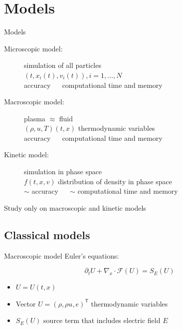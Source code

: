 \documentclass{beamer}
\newcommand{\cmark}{{\color{dgreen}\ding{51}}}%
\newcommand{\xmark}{{\color{red}\ding{55}}}%
\newcommand{\bmark}{{\color{orange}$\sim$}}%
\begin{document}
  \begin{frame}
    \tableofcontents
  \end{frame}

  \section{Models}
  \begin{frame}{Models}
  	\begin{description}
      \item[Microscopic model:] simulation of all particles \\
          $(t,x_i(t),v_i(t)), i=1,\dots,N$ \\
          \cmark{} accuracy $\quad$ \xmark{} computational time and memory
      \item[Macroscopic model:] plasma $\approx$ fluid \\
          $(\rho,u,T)(t,x)$ thermodynamic variables \\
          \xmark{} accuracy $\quad$ \cmark{} computational time and memory
      \item[Kinetic model:] simulation in phase space \\
          $f(t,x,v)$ distribution of density in phase space \\
          \bmark{} accuracy $\quad$ \bmark{} computational time and memory
    \end{description}
    Study only on macroscopic and kinetic models
  \end{frame}


  \subsection{Classical models}
  \begin{frame}{Macroscopic model}
    Euler's equations:

    $$
      \partial_t U + \nabla_x\cdot\mathcal{F}(U) = S_E(U)
    $$

    \begin{itemize}
      \item $U = U(t,x)$
      \item Vector $U = (\rho,\rho u,e)^{\textsf{T}}$ thermodynamic variables
      \item $S_E(U)$ source term that includes electric field $E$
    \end{itemize}
  \end{frame}
\end{document}
